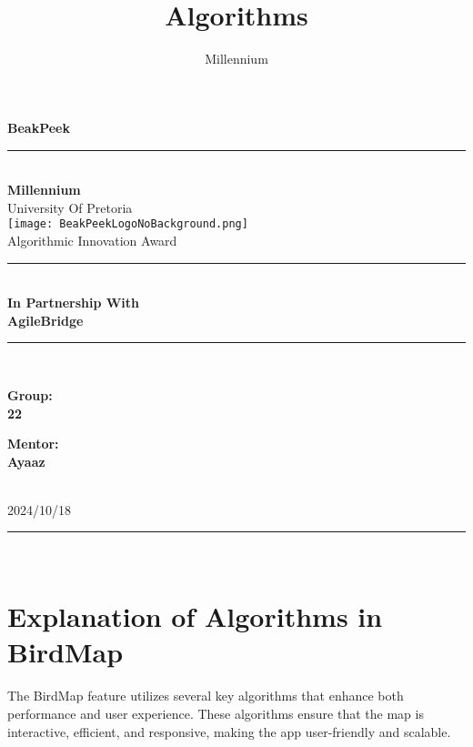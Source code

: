 \documentclass[a4paper]{article}
\title{
\\
{Algorithms}
}
\author{Millennium}
\begin{document}
\begin{titlepage}

\begin{center}

{\Huge \bf BeakPeek}\\[10pt]
\rule{\textwidth}{1pt}\\[20pt]
{\bf \huge \sc Millennium} \\[10pt]
{\huge University Of Pretoria} \\[15pt]
\texttt{[image: BeakPeekLogoNoBackground.png]}\\[15pt]
{\huge Algorithmic Innovation Award}\\[60pt]
\rule{8cm}{1pt}\\[5pt]
{\bf \huge \sc In Partnership With}\\[15pt]
{\huge \bf AgileBridge}\\[5pt]
\rule{8cm}{1pt}\\[50pt]

\begin{minipage}[t]{10cm}
	{\Large{\bf Group:\\ 22}}
\end{minipage}\hfill\begin{minipage}[t]{5cm}\raggedleft
	{\Large{\bf Mentor: \\Ayaaz\\ }}
\end{minipage} \\[90pt]
{\Large 2024/10/18} \\ [5pt]

\rule{\textwidth}{1pt}\\[10pt]

\end{center}

\vfill

\end{titlepage}

\newpage

\tableofcontents

\newpage

\section{Explanation of Algorithms in BirdMap}

The BirdMap feature utilizes several key algorithms that enhance both performance and user experience. These algorithms ensure that the map is interactive, efficient, and responsive, making the app user-friendly and scalable.
\end{document}
